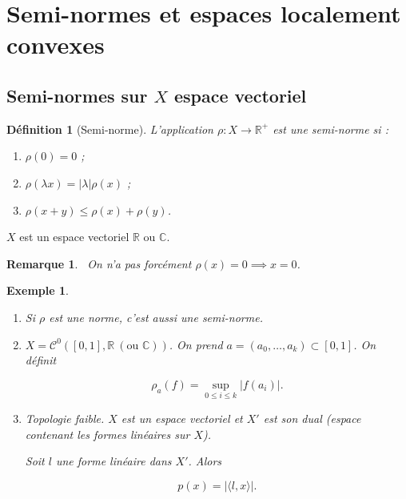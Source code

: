 \documentclass[french]{book}
\newtheorem{definition}{Définition}[section]
\newtheorem*{remark}{Remarque}
\newtheorem{exemple}{Exemple}
\begin{document}

\section{Semi-normes et espaces localement convexes}

\subsection{Semi-normes sur $X$ espace vectoriel}

\begin{definition}[Semi-norme]
  L'application $\rho : X \to \mathbb{R} ^{+}$ est une semi-norme si :
  \begin{enumerate}
    \item $\rho(0) =0$ ;
    \item $\rho(\lambda x) = \lvert \lambda  \rvert \rho(x)$ ;
    \item $\rho(x+y) \leq \rho(x) + \rho(y)$.
  \end{enumerate}
\end{definition}

$X$ est un espace vectoriel $\mathbb{R}$ ou $\mathbb{C}$.

\begin{remark}
  {\selectfont{}\relax} \ On n'a pas forcément $\rho(x) = 0 \implies x=0$.

\end{remark}


\begin{exemple}
  \begin{enumerate}
    \item Si $\rho$ est une norme, c'est aussi une semi-norme.
    \item $X = \mathcal{C}^0([0, 1], \mathbb{R} \ (\text{ou } \mathbb{C}))$. On prend $a = (a_0, \dots, a_k) \subset [0, 1]$. On définit

    \begin{equation*}
      \rho_a (f) = \sup_{ 0 \leq i \leq k } \lvert f(a_i) \rvert .
    \end{equation*}

    \item Topologie faible. $X$ est un espace vectoriel et $X'$ est son dual (espace contenant les formes linéaires sur $X$).

    Soit $l$ une forme linéaire dans $X'$. Alors

    \begin{equation*}
      p(x) = \lvert \langle l,x \rangle  \rvert.
    \end{equation*}
  \end{enumerate}
\end{exemple}
\end{document}
